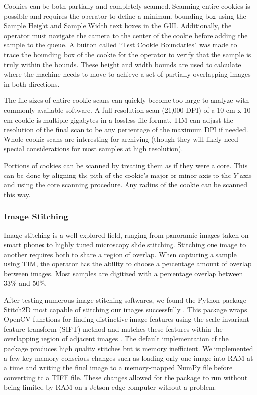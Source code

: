 \documentclass[a4paper,12pt]{article}
\begin{document}
Cookies can be both partially and completely scanned. Scanning entire cookies is possible and requires the operator to define a minimum bounding box using the Sample Height and Sample Width text boxes in the GUI.
Additionally, the operator must navigate the camera to the center of the cookie before adding the sample to the queue. A button called ``Test Cookie Boundaries" was made to trace the bounding box of the cookie for the operator
to verify that the sample is truly within the bounds. These height and width bounds are used to calculate where the machine needs to move to achieve a set of partially overlapping images in both directions. 

The file sizes of entire cookie scans can quickly become too large to analyze with commonly available software. A full resolution scan (21,000 DPI) of a 10 cm x 10 cm cookie is multiple gigabytes in a lossless file format. 
TIM can adjust the resolution of the final scan to be any percentage of the maximum DPI if needed. Whole cookie scans are interesting for archiving (though they will likely need special considerations for most samples at high resolution). 

Portions of cookies can be scanned by treating them as if they were a core. This can be done by aligning the pith of the cookie's major or minor axis to the $Y$ axis and using the core scanning procedure. Any radius of the cookie can be scanned this way.

\subsubsection{Image Stitching}

Image stitching is a well explored field, ranging from panoramic images taken on smart phones to highly tuned microscopy slide stitching. 
Stitching one image to another requires both to share a region of overlap. When capturing a sample using TIM, the operator has the ability to choose a percentage amount of overlap between images.
Most samples are digitized with a percentage overlap between 33\% and 50\%.

After testing numerous image stitching softwares, we found the Python package Stitch2D most capable of stitching our images successfully \citep{mansur_stitch2d_2022}. %
This package wraps OpenCV functions for finding distinctive image features using the scale-invariant feature transform (SIFT) method and matches these features within the overlapping region of adjacent images \citep{lowe_distinctive_2004}. 
The default implementation of the package produces high quality stitches but is memory inefficient. %
We implemented a few key memory-conscious changes such as loading only one image into RAM at a time and writing the final image to a memory-mapped NumPy file before converting to a TIFF file. These changes allowed for the package to run without being limited by RAM on a Jetson edge computer without a problem.
\end{document}

